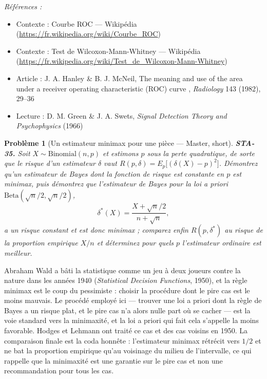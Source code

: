 \documentclass[11pt]{article}
\newtheorem{problem}{Problème}
\newenvironment{refs}{\par\small\noindent\emph{Références :}\begin{itemize}\setlength\itemsep{0pt}}{\end{itemize}\normalsize}
\begin{document}
\begin{refs}
\item Contexte : Courbe ROC --- Wikipédia (\url{https://fr.wikipedia.org/wiki/Courbe_ROC})
\item Contexte : Test de Wilcoxon-Mann-Whitney --- Wikipédia (\url{https://fr.wikipedia.org/wiki/Test_de_Wilcoxon-Mann-Whitney})
\item Article : J. A. Hanley \& B. J. McNeil, \og{} The meaning and use of the area under a receiver operating characteristic (ROC) curve \fg{}, \textit{Radiology} 143 (1982), 29--36
\item Lecture : D. M. Green \& J. A. Swets, \textit{Signal Detection Theory and Psychophysics} (1966)
\end{refs}

\bigskip

\begin{problem}[{Un estimateur minimax pour une pièce --- Master, short}]
\textbf{STA-35.} Soit $ X \sim \mathrm{Binomial}(n, p) $ et estimons
$ p $ sous la perte quadratique, de sorte que le risque d'un estimateur $ \delta $ vaut
$ R(p, \delta) = E_p\big[ (\delta(X) - p)^2 \big] $. Démontrez qu'un estimateur de Bayes dont la
fonction de risque est constante en $ p $ est minimax, puis démontrez que l'estimateur de Bayes
pour la loi a priori $ \mathrm{Beta}(\sqrt{n}/2, \sqrt{n}/2) $,
\[ \delta^{*}(X) = \frac{X + \sqrt{n}/2}{n + \sqrt{n}} , \]
a un risque constant et est donc minimax ; comparez enfin $ R(p, \delta^{*}) $ au risque de la
proportion empirique $ X/n $ et déterminez pour quels $ p $ l'estimateur ordinaire est
meilleur.
\end{problem}

\noindent Abraham Wald a bâti la statistique comme un jeu à deux joueurs contre la nature
dans les années 1940 (\textit{Statistical Decision Functions}, 1950), et la règle minimax est le coup
du pessimiste : choisir la procédure dont le pire cas est le moins mauvais. Le procédé employé ici ---
trouver une loi a priori dont la règle de Bayes a un risque plat, et le pire cas n'a alors nulle
part où se cacher --- est la voie standard vers la minimaxité, et la loi a priori qui fait cela
s'appelle la moins favorable. Hodges et Lehmann ont traité ce cas et des cas voisins en 1950. La
comparaison finale est la coda honnête : l'estimateur minimax rétrécit vers $ 1/2 $ et ne bat la
proportion empirique qu'au voisinage du milieu de l'intervalle, ce qui rappelle que la minimaxité
est une garantie sur le pire cas et non une recommandation pour tous les cas.
\end{document}
